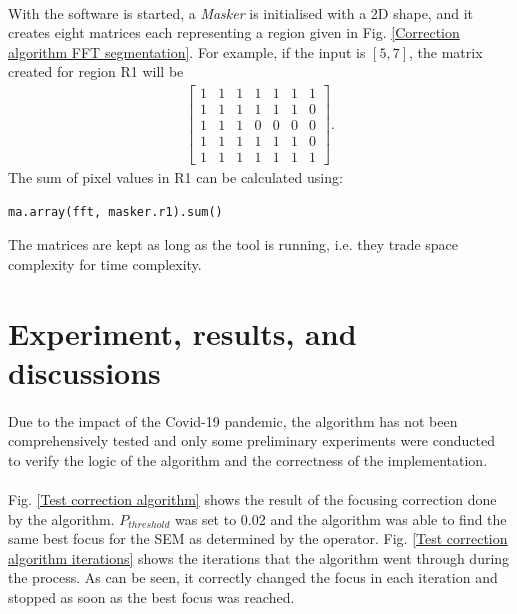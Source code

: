 \documentclass[12pt, twocolumn]{report}
\begin{document}
\paragraph{}
With the software is started, a \textit{Masker} is initialised with a 2D shape, and it creates eight matrices each representing a region given in Fig. \ref{Correction algorithm FFT segmentation}. For example, if the input is $[5, 7]$, the matrix created for region R1 will be
\begin{align*}
\begin{bmatrix}
1 & 1 & 1 & 1 & 1 & 1 & 1\\
1 & 1 & 1 & 1 & 1 & 1 & 0\\
1 & 1 & 1 & 0 & 0 & 0 & 0\\
1 & 1 & 1 & 1 & 1 & 1 & 0\\
1 & 1 & 1 & 1 & 1 & 1 & 1
\end{bmatrix}.
\end{align*}
The sum of pixel values in R1 can be calculated using:
\begin{lstlisting}
ma.array(fft, masker.r1).sum()
\end{lstlisting}
The matrices are kept as long as the tool is running, i.e. they trade space complexity for time complexity. 

\section{Experiment, results, and discussions}
\paragraph{}
Due to the impact of the Covid-19 pandemic, the algorithm has not been comprehensively tested and only some preliminary experiments were conducted to verify the logic of the algorithm and the correctness of the implementation. 

\paragraph{}
Fig. \ref{Test correction algorithm} shows the result of the focusing correction done by the algorithm. $P_{threshold}$ was set to 0.02 and the algorithm was able to find the same best focus for the SEM as determined by the operator. Fig. \ref{Test correction algorithm iterations} shows the iterations that the algorithm went through during the process. As can be seen, it correctly changed the focus in each iteration and stopped as soon as the best focus was reached.
\end{document}
